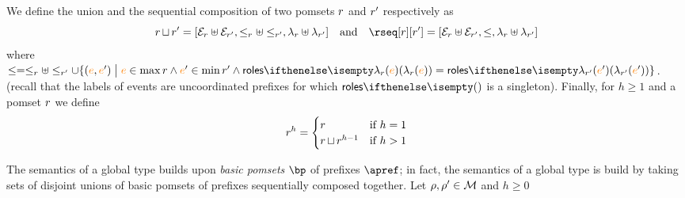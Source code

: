 We define the union and the sequential composition of two pomsets
$r$ and $r'$ respectively as
\[
  \apom \pomsetcup \apom' =
  [\esetof{\apom} \uplus \esetof{\apom'},
  \leqof{\apom} \uplus \leqof{\apom'},
  \alfof{\apom} \uplus \alfof{\apom'}]
  \quad\text{and}\quad
  \rseq[\apom][\apom'] = 
  [\esetof{\apom} \uplus \esetof{\apom'},
  \leq,
  \alfof{\apom} \uplus \alfof{\apom'}]
\]
where
$\leq = \leqof{\apom} \uplus \leqof{\apom'} \cup \{(\ae,\ae') \sst \ae
\in \max \apom \land \ae' \in \min \apom' \land
\roles{\alfof{\apom}(\ae)} = \roles{\alfof{\apom'}(\ae')}\}$.
(recall that the labels of events are uncoordinated prefixes for which
$\roles{}$ is a singleton).
%
%
Finally, for $h \geq 1$ and a pomset $r$ we define
\[
  r^h =
  \begin{cases}
    r & \text{if } h = 1
    \\
    r \operatorname{\sqcup} r^{h-1} & \text{if } h > 1
  \end{cases}
\]

The semantics of a global type builds upon \emph{basic pomsets} $\bp$
of prefixes $\apref$; in fact, the semantics of a global type is build
by taking sets of disjoint unions of basic pomsets of prefixes
sequentially composed together.
%
Let $\rho,\rho' \in \mathcal{M}$ and $h \geq 0$

